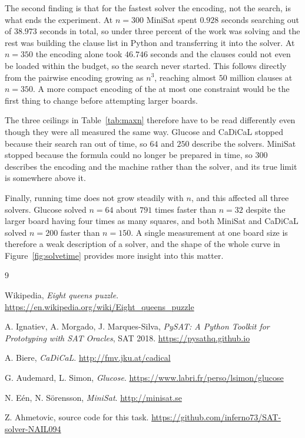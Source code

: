 \documentclass[11pt,a4paper]{article}
\begin{document}
The second finding is that for the fastest solver the
encoding, not the search, is what ends the experiment. At $n=300$ MiniSat
spent $0.928$ seconds searching out of $38.973$ seconds in total, so under
three percent of the work was solving and the rest was building the clause
list in Python and transferring it into the solver. At $n=350$ the encoding
alone took $46.746$ seconds and the clauses could not even be loaded within
the budget, so the search never started. This follows directly from the
pairwise encoding growing as $n^3$, reaching almost $50$ million clauses at
$n=350$. A more compact encoding of the at most one constraint would be the
first thing to change before attempting larger boards.

The three ceilings in Table~\ref{tab:maxn} therefore have to be read
differently even though they were all measured the same way. Glucose and
CaDiCaL stopped because their search ran out of time, so $64$ and $250$
describe the solvers. MiniSat stopped because the formula could no longer be
prepared in time, so $300$ describes the encoding and the machine rather
than the solver, and its true limit is somewhere above it.

Finally, running time does not grow steadily with $n$, and this affected all
three solvers. Glucose solved $n=64$ about $791$ times faster than $n=32$
despite the larger board having four times as many squares, and both MiniSat
and CaDiCaL solved $n=200$ faster than $n=150$. A single measurement at one
board size is therefore a weak description of a solver, and the shape of the
whole curve in Figure~\ref{fig:solvetime} provides more insight into this matter.

\clearpage

\begin{thebibliography}{9}

Wikipedia, \emph{Eight queens puzzle}.
\url{https://en.wikipedia.org/wiki/Eight_queens_puzzle}

A. Ignatiev, A. Morgado, J. Marques-Silva,
\emph{PySAT: A Python Toolkit for Prototyping with SAT Oracles}, SAT 2018.
\url{https://pysathq.github.io}

A. Biere, \emph{CaDiCaL}.
\url{http://fmv.jku.at/cadical}

G. Audemard, L. Simon, \emph{Glucose}.
\url{https://www.labri.fr/perso/lsimon/glucose}

N. E{\'e}n, N. S{\"o}rensson, \emph{MiniSat}.
\url{http://minisat.se}

Z. Ahmetovic, source code for this task.
\url{https://github.com/inferno73/SAT-solver-NAIL094}

\end{thebibliography}
\end{document}
